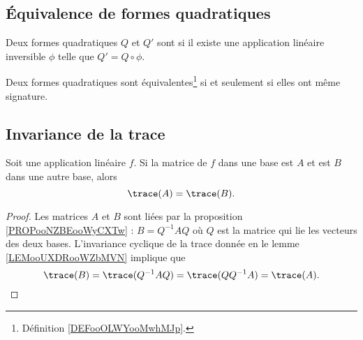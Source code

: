 \subsection{Équivalence de formes quadratiques}

\begin{definition}        \label{DEFooOLWYooMwhMJp}
	Deux formes quadratiques $Q$ et $Q'$ sont  si il existe une application linéaire inversible \( \phi\) telle que \( Q'=Q\circ \phi\).
\end{definition}

\begin{proposition}       \label{PROPooBWXMooLsgyKm}
	Deux formes quadratiques sont équivalentes\footnote{Définition \ref{DEFooOLWYooMwhMJp}.} si et seulement si elles ont même signature.
\end{proposition}


\subsection{Invariance de la trace}

\begin{proposition}      \label{PROPooRMYQooWkEpJJ}
	Soit une application linéaire \( f\). Si la matrice de \( f\) dans une base est \( A\) et est \( B\) dans une autre base, alors
	\begin{equation}
		\trace(A)=\trace(B).
	\end{equation}
\end{proposition}

\begin{proof}
	Les matrices \( A\) et \( B\) sont liées par la proposition \ref{PROPooNZBEooWyCXTw} : \( B=Q^{-1}AQ\) où \( Q\) est la matrice qui lie les vecteurs des deux bases. L'invariance cyclique de la trace donnée en le lemme \ref{LEMooUXDRooWZbMVN} implique que
	\begin{equation}
		\trace(B)=\trace(Q^{-1}AQ)=\trace(QQ^{-1}A)=\trace(A).
	\end{equation}
\end{proof}

